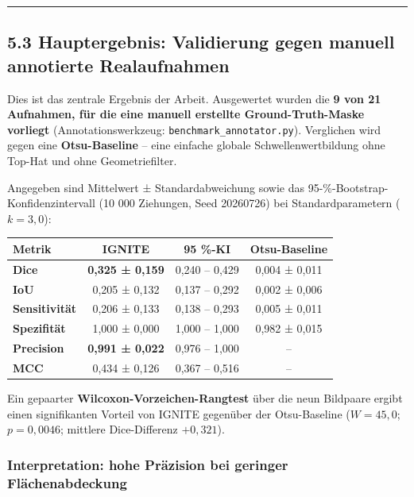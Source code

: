 \documentclass[
  11pt,
]{article}
\newcounter{none} %
\begin{document}
\begin{center}\rule{0.5\linewidth}{0.5pt}\end{center}

\subsection{5.3 Hauptergebnis: Validierung gegen manuell annotierte
Realaufnahmen}\label{hauptergebnis-validierung-gegen-manuell-annotierte-realaufnahmen}

Dies ist das zentrale Ergebnis der Arbeit. Ausgewertet wurden die
\textbf{9 von 21 Aufnahmen, für die eine manuell erstellte
Ground-Truth-Maske vorliegt} (Annotationswerkzeug:
\texttt{benchmark\_annotator.py}). Verglichen wird gegen eine
\textbf{Otsu-Baseline} -- eine einfache globale Schwellenwertbildung
ohne Top-Hat und ohne Geometriefilter.

Angegeben sind Mittelwert ± Standardabweichung sowie das
95-\%-Bootstrap-Konfidenz\-intervall (10 000 Ziehungen, Seed 20260726)
bei Standardparametern (\(k = 3{,}0\)):

{\def\LTcaptype{none} %
\begin{longtable}[]{@{}lccc@{}}
\toprule\noalign{}
Metrik & IGNITE & 95 \%-KI & Otsu-Baseline \\
\midrule\noalign{}
\endhead
\bottomrule\noalign{}
\endlastfoot
\textbf{Dice} & \textbf{0,325 ± 0,159} & 0,240 -- 0,429 & 0,004 ±
0,011 \\
\textbf{IoU} & 0,205 ± 0,132 & 0,137 -- 0,292 & 0,002 ± 0,006 \\
\textbf{Sensitivität} & 0,206 ± 0,133 & 0,138 -- 0,293 & 0,005 ±
0,011 \\
\textbf{Spezifität} & 1,000 ± 0,000 & 1,000 -- 1,000 & 0,982 ± 0,015 \\
\textbf{Precision} & \textbf{0,991 ± 0,022} & 0,976 -- 1,000 & -- \\
\textbf{MCC} & 0,434 ± 0,126 & 0,367 -- 0,516 & -- \\
\end{longtable}
}

Ein gepaarter \textbf{Wilcoxon-Vorzeichen-Rangtest} über die neun
Bildpaare ergibt einen signifikanten Vorteil von IGNITE gegenüber der
Otsu-Baseline (\(W = 45{,}0\); \(p = 0{,}0046\); mittlere Dice-Differenz
\(+0{,}321\)).

\subsubsection{Interpretation: hohe Präzision bei geringer
Flächenabdeckung}\label{interpretation-hohe-pruxe4zision-bei-geringer-fluxe4chenabdeckung}
\end{document}
